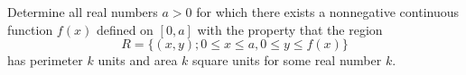 Determine all real numbers $a > 0$ for which there exists a nonnegative
continuous function $f(x)$ defined on $[0,a]$ with the property that the
region
\[
R = \{ (x,y) ; 0
\le x \le a, 0 \le y \le
f(x) \}
\]
has perimeter $k$ units and area $k$ square units for some real number $k$.
